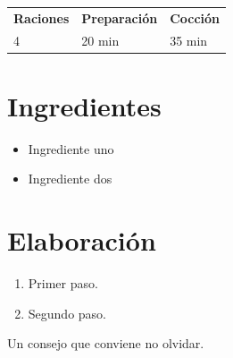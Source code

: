 \documentclass[a4paper,11pt]{article}
\makeatletter
\newcommand{\ficha}[3]{%
    \begin{center}
        \begin{tabular}{l@{\quad}l@{\quad}l}
            \textbf{Raciones} & \textbf{Preparación} & \textbf{Cocción} \\
            #1                & #2                   & #3               \\
        \end{tabular}
    \end{center}
}
\makeatother
\begin{document}
\begin{center}
    {\LARGE\bfseries \eltitulo}
\end{center}

\ficha{4}{20 min}{35 min}

\section{Ingredientes}

\begin{itemize}
    \item Ingrediente uno
    \item Ingrediente dos
\end{itemize}

\section{Elaboración}

\begin{enumerate}
    \item Primer paso.
    \item Segundo paso.
\end{enumerate}

\begin{nota}[Truco]
    Un consejo que conviene no olvidar.
\end{nota}
\end{document}

